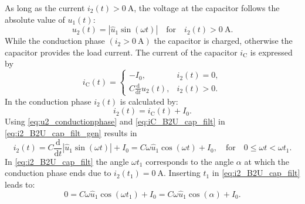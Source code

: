 \begin{solutionblock}
    As long as the current $i_\mathrm{2}(t)>\SI{0}{\ampere}$, the voltage at the 
    capacitor follows the absolute value of $u_\mathrm{1}(t)$:
    \begin{equation} 
        u_\mathrm{2}(t) = \left| \hat{u}_\mathrm{1}\sin(\omega t)\right| \quad \text{for} \quad i_\mathrm{2}(t)>\SI{0}{\ampere}.
        \label{eq:u2_conductionphase}
    \end{equation}
    While the conduction phase $(i_\mathrm{2} > \SI{0}{\ampere})$ the capacitor is charged, otherwise the capacitor provides the load current. 
    The current of the capacitor $i_\mathrm{C}$ is expressed by
    \begin{equation}
        i_\mathrm{C}(t) = \begin{cases}
            -I_\mathrm{0}, & i_2(t) = 0,\\
            C\frac{\mathrm{d}}{\mathrm{d}t}u_2(t), & i_2(t) > 0.
        \end{cases}
        \label{eq:iC_B2U_cap_filt}
    \end{equation}
    In the conduction phase $i_\mathrm{2}(t)$ is calculated by:
    \begin{equation}
        i_2(t) = i_\mathrm{C}(t) + I_\mathrm{0}.
        \label{eq:i2_B2U_cap_filt_gen}
    \end{equation}
    Using \eqref{eq:u2_conductionphase} and \eqref{eq:iC_B2U_cap_filt} in \eqref{eq:i2_B2U_cap_filt_gen} results in
    \begin{equation}
        i_2(t) = C\frac{\mathrm{d}}{\mathrm{d}t}\left| \hat{u}_\mathrm{1}\sin(\omega t)\right| + I_0=
        C\omega \hat{u}_1 \cos(\omega t) + I_\mathrm{0}, \quad \text{for} \quad 0 \leq \omega t < \omega t_1.
        \label{eq:i2_B2U_cap_filt}
    \end{equation}
    In \eqref{eq:i2_B2U_cap_filt} the angle $\omega t_1$ corresponds to the angle $\alpha$ at which the conduction phase ends due to
    $i_\mathrm{2}(t_1)=\SI{0}{\ampere}$. Inserting $t_1$ in \eqref{eq:i2_B2U_cap_filt} leads to:
    \begin{equation}
        0 = C\omega \hat{u}_\mathrm{1} \cos(\omega t_\mathrm{1}) + I_\mathrm{0} = C\omega \hat{u}_1 \cos(\alpha) + I_\mathrm{0} .
        \label{eq:alpha_B2U_cap_filt_gen}

\end{equation}
\end{solutionblock}

